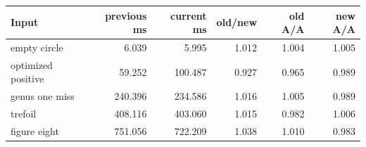 \begin{center}
\small
\begin{tabular}{lrrrrr}
\toprule
Input & previous ms & current ms & old/new & old A/A & new A/A\\
\midrule
empty circle & 6.039 & 5.995 & 1.012 & 1.004 & 1.005\\
optimized positive & 59.252 & 100.487 & 0.927 & 0.965 & 0.989\\
genus one miss & 240.396 & 234.586 & 1.016 & 1.005 & 0.989\\
trefoil & 408.116 & 403.060 & 1.015 & 0.982 & 1.006\\
figure eight & 751.056 & 722.209 & 1.038 & 1.010 & 0.983\\
\bottomrule
\end{tabular}
\end{center}
